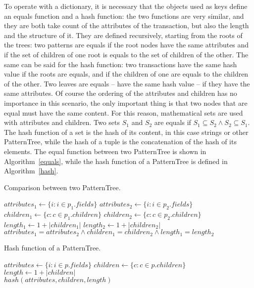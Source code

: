 \documentclass{acm_proc_article-sp-sigmod09}
\begin{document}
To operate with a dictionary, it is necessary that the objects used as keys define an equals function and a hash function: the two functions are very similar, and they are both take count of the attributes of the transaction, but also the length and the structure of it. They are defined recursively, starting from the roots of the trees: two patterns are equals if the root nodes have the same attributes and if the set of children of one root is equals to the set of children of the other. The same can be said for the hash function: two transactions have the same hash value if the roots are equals, and if the children of one are equals to the children of the other. Two leaves are equals -- have the same hash value -- if they have the same attributes. Of course the ordering of the attributes and children has no importance in this scenario, the only important thing is that two nodes that are equal must have the same content. For this reason, mathematical sets are used with attributes and children. Two sets $S_1$ and $S_2$ are equals if $S_1 \subseteq S_2 \land S_2 \subseteq S_1$. The hash function of a set is the hash of its content, in this case strings or other PatternTree, while the hash of a tuple is the concatenation of the hash of its elements. The equal function between two PatternTree is shown in Algorithm~\ref{equals}, while the hash function of a PatternTree is defined in Algorithm~\ref{hash}.

\begin{algorithm}
\caption{Comparison between two PatternTree.}
\label{equals}
\begin{algorithmic}[1]
\State $attributes_1 \gets \{i : i \in p_1.fields\}$
\State $attributes_2 \gets \{i : i \in p_2.fields\}$
\State $children_1 \gets \{c : c \in p_1.children\}$
\State $children_2 \gets \{c : c \in p_2.children\}$
\State $length_1 \gets 1 + |children_1|$
\State $length_2 \gets 1 + |children_2|$ \\
\Return $attributes_1 = attributes_2 \land children_1 = children_2 \land length_1 = length_2$
\EndFunction
\end{algorithmic}
\end{algorithm}

\begin{algorithm}
\caption{Hash function of a PatternTree.}
\label{hash}
\begin{algorithmic}[1]
\State $attributes \gets \{i : i \in p.fields\}$
\State $children \gets \{c : c \in p.children\}$
\State $length \gets 1 + |children|$ \\
\Return $hash(attributes, children, length)$
\EndFunction
\end{algorithmic}
\end{algorithm}
\end{document}
